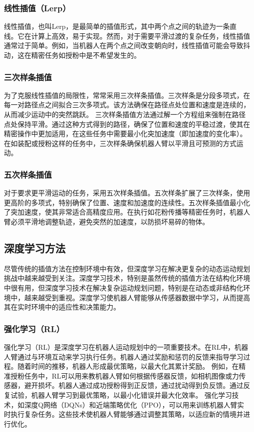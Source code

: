 \subsubsection{线性插值（Lerp）}
线性插值，也叫Lerp，是最简单的插值形式，其中两个点之间的轨迹为一条直线。它在计算上高效，易于实现。然而，对于需要平滑过渡的复杂任务，线性插值通常过于简单。例如，当机器人在两个点之间改变朝向时，线性插值可能会导致抖动，这在精密任务如授粉中是不希望发生的。
\subsubsection{三次样条插值}
为了克服线性插值的局限性，常常采用三次样条插值。三次样条是分段多项式，在每一对路径点之间拟合三次多项式。该方法确保在路径点处位置和速度是连续的，从而减少运动中的突然跳跃。
三次样条插值方法通过解一个方程组来强制在路径点处保持平滑。通过这种方式得到的路径，确保了位置和速度的平稳过渡，使其在精密操作中更加适用，在这些任务中需要最小化突加速度（即加速度的变化率）。在如装配或授粉这样的任务中，三次样条确保机器人臂以平滑且可预测的方式运动。
\subsubsection{五次样条插值}
对于要求更平滑运动的任务，采用五次样条插值。五次样条扩展了三次样条，使用更高阶的多项式，特别确保了位置、速度和加速度的连续性。五次样条插值最小化了突加速度，使其非常适合高精度应用。在执行如花粉传播等精密任务时，机器人臂必须平滑地调整轨迹，避免突然的加速度，以防损坏易碎的物体。

\subsection{深度学习方法}
尽管传统的插值方法在控制环境中有效，但深度学习在解决更复杂的动态运动规划挑战中越来越受到关注。深度学习技术，特别是虽然传统的插值方法在结构化环境中很有用，但深度学习技术在解决复杂运动规划问题，特别是在动态或非结构化环境中，越来越受到重视。深度学习使机器人臂能够从传感器数据中学习，从而提高其在实时环境中的适应性和决策能力。
\subsubsection{强化学习（RL）}
强化学习（RL）是深度学习在机器人运动规划中的一项重要技术。在RL中，机器人臂通过与环境互动来学习执行任务。机器人通过奖励和惩罚的反馈来指导学习过程。随着时间的推移，机器人形成最优策略，以最大化其累计奖励。
例如，在精准授粉任务中，RL可以用来教机器人臂如何根据传感器反馈，如相机图像或力传感器，避开损坏。机器人通过成功授粉得到正反馈，通过扰动得到负反馈。通过反复试验，机器人臂学习到最优策略，以最小化错误并最大化效率。
强化学习技术，如深度Q网络（DQNs）和近端策略优化（PPO），可以用来训练机器人臂实时执行复杂任务。这些技术使机器人臂能够通过调整其策略，以适应新的情境并进行优化。
